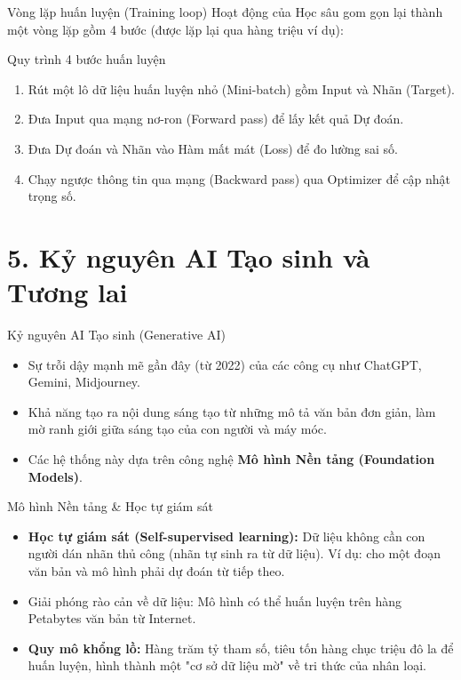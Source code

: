 \documentclass[aspectratio=169]{beamer}
\begin{document}
\begin{frame}{Vòng lặp huấn luyện (Training loop)}
    Hoạt động của Học sâu gom gọn lại thành một vòng lặp gồm 4 bước (được lặp lại qua hàng triệu ví dụ):
    \begin{block}{Quy trình 4 bước huấn luyện}
        \begin{enumerate}
            \item Rút một lô dữ liệu huấn luyện nhỏ (Mini-batch) gồm Input và Nhãn (Target).
            \item Đưa Input qua mạng nơ-ron (Forward pass) để lấy kết quả Dự đoán.
            \item Đưa Dự đoán và Nhãn vào Hàm mất mát (Loss) để đo lường sai số.
            \item Chạy ngược thông tin qua mạng (Backward pass) qua Optimizer để cập nhật trọng số.
        \end{enumerate}
    \end{block}
\end{frame}

\section{5. Kỷ nguyên AI Tạo sinh và Tương lai}

\begin{frame}{Kỷ nguyên AI Tạo sinh (Generative AI)}
    \begin{itemize}
        \item Sự trỗi dậy mạnh mẽ gần đây (từ 2022) của các công cụ như ChatGPT, Gemini, Midjourney.
        \item Khả năng tạo ra nội dung sáng tạo từ những mô tả văn bản đơn giản, làm mờ ranh giới giữa sáng tạo của con người và máy móc.
        \item Các hệ thống này dựa trên công nghệ \textbf{Mô hình Nền tảng (Foundation Models)}.
    \end{itemize}
\end{frame}

\begin{frame}{Mô hình Nền tảng \& Học tự giám sát}
    \begin{itemize}
        \item \textbf{Học tự giám sát (Self-supervised learning):} Dữ liệu không cần con người dán nhãn thủ công (nhãn tự sinh ra từ dữ liệu). Ví dụ: cho một đoạn văn bản và mô hình phải dự đoán từ tiếp theo.
        \item Giải phóng rào cản về dữ liệu: Mô hình có thể huấn luyện trên hàng Petabytes văn bản từ Internet.
        \item \textbf{Quy mô khổng lồ:} Hàng trăm tỷ tham số, tiêu tốn hàng chục triệu đô la để huấn luyện, hình thành một "cơ sở dữ liệu mờ" về tri thức của nhân loại.
    \end{itemize}
\end{frame}
\end{document}
